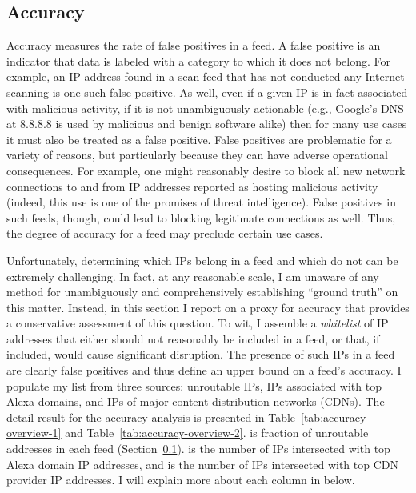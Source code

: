 \subsection{Accuracy}
\label{sec:ip-accuracy}


Accuracy measures the rate of false positives in a feed. A false
positive is an indicator that data is labeled with a category to which
it does not belong.  For example, an IP address found in a scan feed
that has not conducted any Internet scanning is one such false
positive.  As well, even if a given IP is in fact associated with
malicious activity, if it is not unambiguously actionable (e.g.,
Google's DNS at 8.8.8.8 is used by malicious and benign software
alike) then for many use cases it must also be treated as a false
positive.  False positives are problematic for a variety of reasons,
but particularly because they can have adverse operational
consequences.  For example, one might reasonably desire to block all
new network connections to and from IP addresses reported as hosting
malicious activity (indeed, this use is one of the promises of threat
intelligence). False positives in such feeds, though, could lead to
blocking legitimate connections as well.  Thus, the degree of accuracy
for a feed may preclude certain use cases.

Unfortunately, determining which IPs belong in a feed and which do not
can be extremely challenging. In fact, at any reasonable scale, I am
unaware of any method for unambiguously and comprehensively
establishing ``ground truth'' on this matter.  Instead, in this
section I report on a proxy for accuracy that provides a
conservative assessment of this question.  To wit, I assemble a
\emph{whitelist} of IP addresses that either should not reasonably be
included in a feed, or that, if included, would cause significant
disruption. The presence of such IPs in a feed are
clearly false positives and thus define an upper bound on a feed's
accuracy.  I populate my list from three sources: unroutable IPs,
IPs associated with top Alexa domains, and IPs of major content
distribution networks (CDNs). The detail result for the accuracy analysis 
is presented in Table~\ref{tab:accuracy-overview-1} and 
Table~\ref{tab:accuracy-overview-2}.
 is fraction of unroutable addresses in each feed
(Section~\ref{sec:ip-accuracy}).
 is the number of IPs intersected with top Alexa domain 
IP addresses, and  is the number of IPs intersected with 
top CDN provider IP addresses. I will explain more about each column in below.


